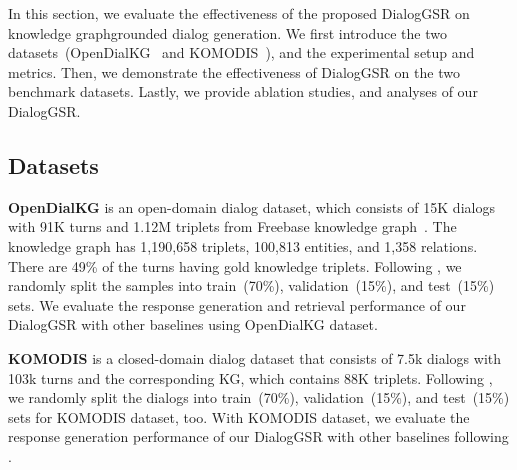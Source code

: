 







In this section, we evaluate the effectiveness of the proposed DialogGSR on knowledge graph{\textendash}grounded dialog generation.
We first introduce the two datasets~(OpenDialKG~\cite{moon2019opendialkg} and KOMODIS~\cite{galetzka2020corpus}), and the experimental setup and metrics.
Then, we demonstrate the effectiveness of DialogGSR on the two benchmark datasets.
Lastly, we provide ablation studies, and analyses of our DialogGSR. 

\subsection{Datasets}
\textbf{OpenDialKG} is an open-domain dialog dataset, which consists of 15K dialogs with 91K turns and 1.12M triplets from Freebase knowledge graph~\cite{bast2014easy}.
The knowledge graph has 1,190,658 triplets, 100,813 entities, and 1,358 relations.
There are 49\% of the turns having gold knowledge triplets.
Following \cite{galetzka2020corpus}, we randomly split the samples into train~(70\%), validation~(15\%), and test~(15\%) sets.
We evaluate the response generation and retrieval performance of our DialogGSR with other baselines using OpenDialKG dataset.

\noindent\textbf{KOMODIS} is a closed-domain dialog dataset that consists of 7.5k dialogs with 103k turns and the corresponding KG, which contains 88K triplets.
Following \cite{moon2019opendialkg,kang2022knowledge,galetzka2020corpus}, we randomly split the dialogs into train~(70\%), validation~(15\%), and test~(15\%) sets for KOMODIS dataset, too.
With KOMODIS dataset, we evaluate the response generation performance of our DialogGSR with other baselines following \cite{kang2022knowledge,galetzka2021space}.